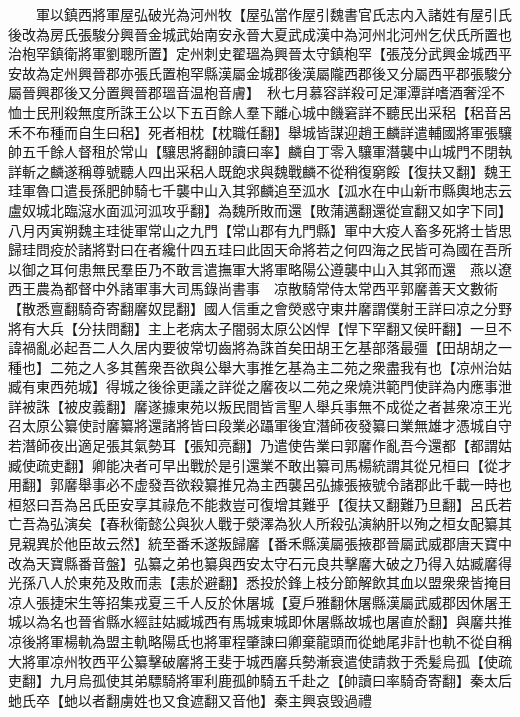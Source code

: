　　軍以鎮西將軍屋弘破光為河州牧【屋弘當作屋引魏書官氏志内入諸姓有屋引氏後改為房氏張駿分興晉金城武始南安永晉大夏武成漢中為河州北河州乞伏氏所置也治枹罕鎮衛將軍劉聰所置】定州刺史翟瑥為興晉太守鎮枹罕【張茂分武興金城西平安故為定州興晉郡亦張氏置枹罕縣漢屬金城郡後漢屬隴西郡後又分屬西平郡張駿分屬晉興郡後又分置興晉郡瑥音温枹音膚】　秋七月慕容詳殺可足渾潭詳嗜酒奢淫不恤士民刑殺無度所誅王公以下五百餘人羣下離心城中饑窘詳不聽民出采稆【稆音呂禾不布種而自生曰稆】死者相枕【枕職任翻】舉城皆謀迎趙王麟詳遣輔國將軍張驤帥五千餘人督租於常山【驤思將翻帥讀曰率】麟自丁零入驤軍潛襲中山城門不閉執詳斬之麟遂稱尊號聽人四出采稆人既飽求與魏戰麟不從稍復窮餒【復扶又翻】魏王珪軍魯口遣長孫肥帥騎七千襲中山入其郛麟追至泒水【泒水在中山新市縣輿地志云盧奴城北臨滱水面泒河泒攻乎翻】為魏所敗而還【敗蒲邁翻還從宣翻又如字下同】八月丙寅朔魏主珪徙軍常山之九門【常山郡有九門縣】軍中大疫人畜多死將士皆思歸珪問疫於諸將對曰在者纔什四五珪曰此固天命將若之何四海之民皆可為國在吾所以御之耳何患無民羣臣乃不敢言遣撫軍大將軍略陽公遵襲中山入其郛而還　燕以遼西王農為都督中外諸軍事大司馬錄尚書事　凉散騎常侍太常西平郭黁善天文數術【散悉亶翻騎奇寄翻黁奴昆翻】國人信重之會熒惑守東井黁謂僕射王詳曰凉之分野將有大兵【分扶問翻】主上老病太子闇弱太原公凶悍【悍下罕翻又侯旰翻】一旦不諱禍亂必起吾二人久居内要彼常切齒將為誅首矣田胡王乞基部落最彊【田胡胡之一種也】二苑之人多其舊衆吾欲與公舉大事推乞基為主二苑之衆盡我有也【凉州治姑臧有東西苑城】得城之後徐更議之詳從之黁夜以二苑之衆燒洪範門使詳為内應事泄詳被誅【被皮義翻】黁遂據東苑以叛民間皆言聖人舉兵事無不成從之者甚衆凉王光召太原公纂使討黁纂將還諸將皆曰段業必躡軍後宜潛師夜發纂曰業無雄才憑城自守若潛師夜出適足張其氣勢耳【張知亮翻】乃遣使告業曰郭黁作亂吾今還都【都謂姑臧使疏吏翻】卿能决者可早出戰於是引還業不敢出纂司馬楊統謂其從兄桓曰【從才用翻】郭黁舉事必不虚發吾欲殺纂推兄為主西襲呂弘據張掖號令諸郡此千載一時也桓怒曰吾為呂氏臣安享其祿危不能救豈可復增其難乎【復扶又翻難乃旦翻】呂氏若亡吾為弘演矣【春秋衛懿公與狄人戰于滎澤為狄人所殺弘演納肝以殉之桓女配纂其見親異於他臣故云然】統至番禾遂叛歸黁【番禾縣漢屬張掖郡晉屬武威郡唐天寶中改為天寶縣番音盤】弘纂之弟也纂與西安太守石元良共擊黁大破之乃得入姑臧黁得光孫八人於東苑及敗而恚【恚於避翻】悉投於鋒上枝分節解飲其血以盟衆衆皆掩目凉人張捷宋生等招集戎夏三千人反於休屠城【夏戶雅翻休屠縣漢屬武威郡因休屠王城以為名也晉省縣水經註姑臧城西有馬城東城即休屠縣故城也屠直於翻】與黁共推凉後將軍楊軌為盟主軌略陽氐也將軍程肇諫曰卿棄龍頭而從虵尾非計也軌不從自稱大將軍凉州牧西平公纂擊破黁將王斐于城西黁兵勢漸衰遣使請救于秃髪烏孤【使疏吏翻】九月烏孤使其弟驃騎將軍利鹿孤帥騎五千赴之【帥讀曰率騎奇寄翻】秦太后虵氏卒【虵以者翻虜姓也又食遮翻又音他】秦主興哀毁過禮

